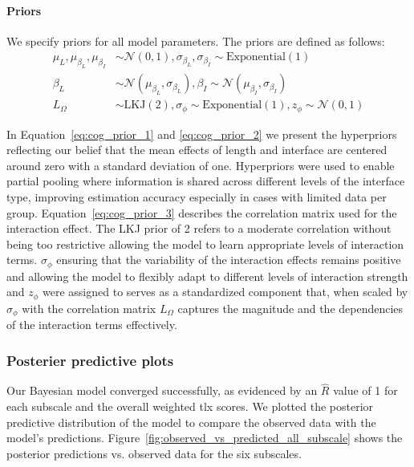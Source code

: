 \paragraph{Priors}
We specify priors for all model parameters. The priors are defined as follows:
\begin{align}
    \mu_{L}, \mu_{\beta_L}, \mu_{\beta_I} &\sim \mathcal{N}(0, 1), \sigma_{\beta_L}, \sigma_{\beta_I} \sim \text{Exponential}(1) \label{eq:cog_prior_1} \\
    \beta_L &\sim \mathcal{N}(\mu_{\beta_L}, \sigma_{\beta_L}), \beta_I \sim \mathcal{N}(\mu_{\beta_I}, \sigma_{\beta_I}) \label{eq:cog_prior_2} \\
    L_{\Omega} &\sim \text{LKJ}(2), \sigma_{\phi} \sim \text{Exponential}(1), z_{\phi} \sim \mathcal{N}(0, 1) \label{eq:cog_prior_3} 
\end{align}

In Equation~\ref{eq:cog_prior_1} and \ref{eq:cog_prior_2} we present the hyperpriors reflecting our belief that the mean effects of length and interface are centered around zero with a standard deviation of one. Hyperpriors were used to enable partial pooling where information is shared across different levels of the interface type, improving estimation accuracy especially in cases with limited data per group. Equation~\ref{eq:cog_prior_3} describes the correlation matrix used for the interaction effect. The LKJ prior of 2 refers to a moderate correlation without being too restrictive allowing the model to learn appropriate levels of interaction terms. $\sigma_{\phi}$ ensuring that the variability of the interaction effects remains positive and allowing the model to flexibly adapt to different levels of interaction strength and $z_{\phi}$ were assigned to serves as a standardized component that, when scaled by $\sigma_{\phi}$ with the correlation matrix $L_{\Omega}$ captures the magnitude and the dependencies of the interaction terms effectively.

\subsubsection{Posterier predictive plots}
Our Bayesian model converged successfully, as evidenced by an $\hat{R}$ value of 1 for each subscale and the overall weighted tlx scores. We plotted the posterior predictive distribution of the model to compare the observed data with the model's predictions. Figure~\ref{fig:observed_vs_predicted_all_subscale} shows the posterior predictions vs. observed data for the six subscales.

